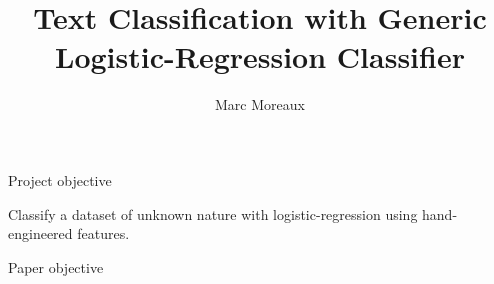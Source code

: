 \documentclass{beamer}
\title{Text Classification with Generic Logistic-Regression Classifier}
\author{Marc Moreaux}
\institute{Aalborg university}
\begin{document}
	\begin{frame}
		\titlepage
	\end{frame}



	\begin{frame}{Project objective}

		\begin{block}{}
			Classify a dataset of unknown nature with logistic-regression using hand-engineered features.
		\end{block}

	\end{frame}












	\begin{frame}{Paper objective}

		\tableofcontents

	\end{frame}
\end{document}
